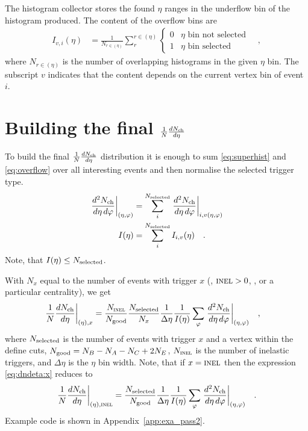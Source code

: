 \documentclass[11pt]{article}
\def\AlwaysText#1{\ifmmode\relax\text{#1}\else #1\fi}
\newcommand{\AbbrName}[1]{\AlwaysText{{\scshape #1}}}
\newcommand{\INEL}{\AbbrName{inel}}
\newcommand{\INELONE}{$\AbbrName{inel}>0$}
\newcommand{\NSD}{\AbbrName{nsd}}
\newcommand{\mult}[1][]{\ensuremath N_{\text{ch}#1}}
\newcommand{\dndetadphi}[1][]{{\ensuremath%
    \ifx|#1|\else\left.\fi%
    \frac{d^2\mult{}}{d\eta\,d\varphi}%
    \ifx|#1|\else\right|_{#1}\fi%
}}
\newcommand{\dndeta}[1][]{{\ensuremath%
    \ifx|#1|\else\left.\fi%
    \frac{1}{N}\frac{d\mult{}}{d\eta}%
    \ifx|#1|\else\right|_{#1}\fi%
}}
\newcommand{\Nsel}{{\ensuremath N_{\text{selected}}}}
\newcommand{\Ngood}{{\ensuremath N_{\text{good}}}}
\newcommand{\etaphi}{\ensuremath(\eta,\varphi)}
\begin{document}
The histogram collector stores the found $\eta$ ranges in the
underflow bin of the histogram produced.  The content of the overflow
bins are 
\begin{align}
  \label{eq:overflow}
  I_{v,i}(\eta) &= 
  \frac{1}{N_{r\in(\eta)}}
  \sum_{r}^{r\in(\eta)} \left\{\begin{array}{cl} 
      0 & \eta \text{\ bin not selected}\\ 
      1 & \eta \text{\ bin selected}
      \end{array}\right.\quad,
\end{align}
where $N_{r\in(\eta)}$ is the number of overlapping histograms in the
given $\eta$ bin.  The subscript $v$ indicates that the content
depends on the current vertex bin of event $i$.

\section{Building the final $\dndeta$}
\label{sec:ana_aod}

To build the final $\dndeta$ distribution it is enough to sum
\eqref{eq:superhist} and \eqref{eq:overflow} over all interesting
events and then normalise the selected trigger type.
\begin{align}
  \dndetadphi[\etaphi] &= \sum_i^{\Nsel}\dndetadphi[i,v\etaphi]\\ 
  I(\eta) &= \sum_i^{\Nsel}I_{i,v}(\eta)\quad.
\end{align}
Note, that $I(\eta)\le\Nsel$.  

With $N_x$ equal to the number of events with trigger $x$ (\INEL,
\INELONE, \NSD, or a particular centrality), we get
\begin{align}
  \label{eq:dndeta:x}
  \dndeta[(\eta),x] &=
  \frac{N_{\INEL}}{\Ngood}\frac{\Nsel}{N_x}\frac{1}{\Delta\eta}
  \frac{1}{I(\eta)}\sum_{\varphi}\dndetadphi[\etaphi]\quad,
\end{align}
where $\Nsel$ is the number of events with trigger $x$ and a vertex
within the define cuts, $\Ngood=N_B-N_A-N_C+2N_E$, $N_{\INEL}$ is the
number of inelastic triggers, and $\Delta\eta$ is the $\eta$ bin
width.  Note, that if $x=\INEL$ then the expression
\eqref{eq:dndeta:x} reduces to 
\begin{align*}
  \dndeta[(\eta),\INEL] =
  \frac{\Nsel}{\Ngood}\frac{1}{\Delta\eta}
  \frac{1}{I(\eta)}\sum_{\varphi}\dndetadphi[\etaphi]\quad.  
\end{align*}
Example code is shown in Appendix~\ref{app:exa_pass2}.
\end{document}
